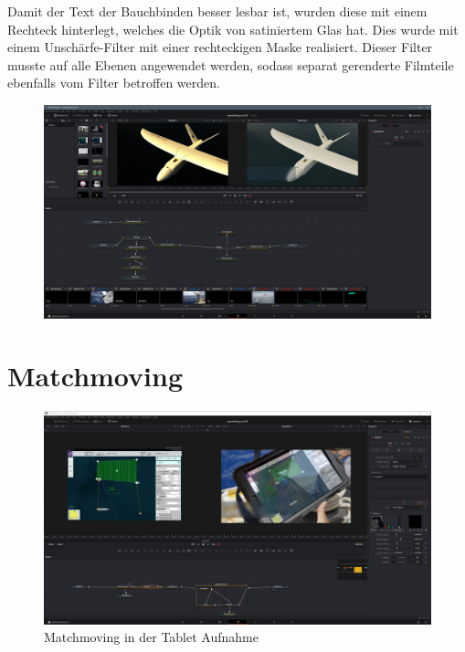 Damit der Text der Bauchbinden besser lesbar ist, wurden diese mit einem Rechteck hinterlegt, welches die Optik von satiniertem Glas hat. Dies wurde mit einem Unschärfe-Filter mit einer rechteckigen Maske realisiert. Dieser Filter musste auf alle Ebenen angewendet werden, sodass separat gerenderte Filmteile ebenfalls vom Filter betroffen werden.

\begin{figure}[H]
\begin{center}
\includegraphics[width=\textwidth]{gfx/post/resolve3.jpg}
\caption{}
\label{resolve3}
\end{center}
\end{figure}

\section{Matchmoving}

\begin{figure}[H]
\begin{center}
\includegraphics[width=\textwidth]{gfx/post/resolve9.jpg}
\caption{Matchmoving in der Tablet Aufnahme}
\label{resolve8}
\end{center}
\end{figure}

